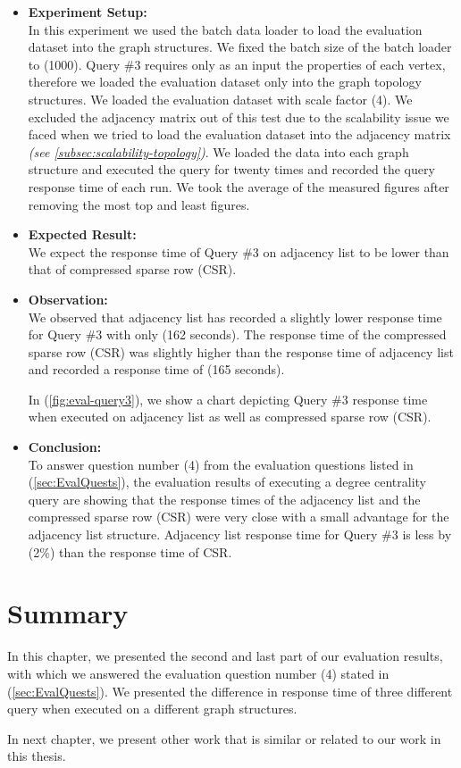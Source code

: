 {\begin{itemize}
\item \textbf{Experiment Setup:}\\
In this experiment we used the batch data loader to load the evaluation dataset into the graph structures. We fixed the batch size of the batch loader to (1000). Query \#3 requires only as an input the properties of each vertex, therefore we loaded the evaluation dataset only into the graph topology structures. We loaded the evaluation dataset with scale factor (4). We excluded the adjacency matrix out of this test due to the scalability issue we faced when we tried to load the evaluation dataset into the adjacency matrix \textit{(see \ref{subsec:scalability-topology})}. We loaded the data into each graph structure and executed the query for twenty times and recorded the query response time of each run. We took the average of the measured figures after removing the most top and least figures.

\item \textbf{Expected Result:}\\
We expect the response time of Query \#3 on adjacency list to be lower than that of compressed sparse row (CSR).

\item \textbf{Observation:}\\
We observed that adjacency list has recorded a slightly lower response time for Query \#3 with only (162 seconds). The response time of the compressed sparse row (CSR) was slightly higher than the response time of adjacency list and recorded a response time of (165 seconds). 

In (\ref{fig:eval-query3}), we show a chart depicting Query \#3 response time when executed on adjacency list as well as compressed sparse row (CSR).

\item \textbf{Conclusion:}\\
To answer question number (4) from the evaluation questions listed in (\ref{sec:EvalQuests}), the evaluation results of executing a degree centrality query are showing that the response times of the adjacency list and the compressed sparse row (CSR) were very close with a small advantage for the adjacency list structure. Adjacency list response time for Query \#3 is less by (2\%) than the response time of CSR.


\end{itemize}


\section{Summary}
\label{sec:eval-summary_part2}

In this chapter, we presented the second and last part of our evaluation results, with which we answered the evaluation question number (4) stated in (\ref{sec:EvalQuests}). We presented the difference in response time of three different query when executed on a different graph structures.

In next chapter, we present other work that is similar or related to our work in this thesis.


}